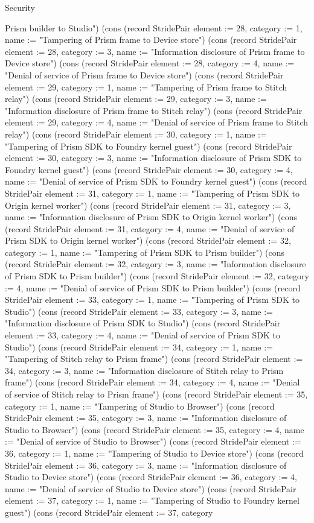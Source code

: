 \begin{lexlean}{Security}
\begin{semanticmodule}
{Prism builder to Studio"}) (cons (record StridePair {element := 28, category := 1, name := "Tampering of Prism frame to Device store"}) (cons (record StridePair {element := 28, category := 3, name := "Information disclosure of Prism frame to Device store"}) (cons (record StridePair {element := 28, category := 4, name := "Denial of service of Prism frame to Device store"}) (cons (record StridePair {element := 29, category := 1, name := "Tampering of Prism frame to Stitch relay"}) (cons (record StridePair {element := 29, category := 3, name := "Information disclosure of Prism frame to Stitch relay"}) (cons (record StridePair {element := 29, category := 4, name := "Denial of service of Prism frame to Stitch relay"}) (cons (record StridePair {element := 30, category := 1, name := "Tampering of Prism SDK to Foundry kernel guest"}) (cons (record StridePair {element := 30, category := 3, name := "Information disclosure of Prism SDK to Foundry kernel guest"}) (cons (record StridePair {element := 30, category := 4, name := "Denial of service of Prism SDK to Foundry kernel guest"}) (cons (record StridePair {element := 31, category := 1, name := "Tampering of Prism SDK to Origin kernel worker"}) (cons (record StridePair {element := 31, category := 3, name := "Information disclosure of Prism SDK to Origin kernel worker"}) (cons (record StridePair {element := 31, category := 4, name := "Denial of service of Prism SDK to Origin kernel worker"}) (cons (record StridePair {element := 32, category := 1, name := "Tampering of Prism SDK to Prism builder"}) (cons (record StridePair {element := 32, category := 3, name := "Information disclosure of Prism SDK to Prism builder"}) (cons (record StridePair {element := 32, category := 4, name := "Denial of service of Prism SDK to Prism builder"}) (cons (record StridePair {element := 33, category := 1, name := "Tampering of Prism SDK to Studio"}) (cons (record StridePair {element := 33, category := 3, name := "Information disclosure of Prism SDK to Studio"}) (cons (record StridePair {element := 33, category := 4, name := "Denial of service of Prism SDK to Studio"}) (cons (record StridePair {element := 34, category := 1, name := "Tampering of Stitch relay to Prism frame"}) (cons (record StridePair {element := 34, category := 3, name := "Information disclosure of Stitch relay to Prism frame"}) (cons (record StridePair {element := 34, category := 4, name := "Denial of service of Stitch relay to Prism frame"}) (cons (record StridePair {element := 35, category := 1, name := "Tampering of Studio to Browser"}) (cons (record StridePair {element := 35, category := 3, name := "Information disclosure of Studio to Browser"}) (cons (record StridePair {element := 35, category := 4, name := "Denial of service of Studio to Browser"}) (cons (record StridePair {element := 36, category := 1, name := "Tampering of Studio to Device store"}) (cons (record StridePair {element := 36, category := 3, name := "Information disclosure of Studio to Device store"}) (cons (record StridePair {element := 36, category := 4, name := "Denial of service of Studio to Device store"}) (cons (record StridePair {element := 37, category := 1, name := "Tampering of Studio to Foundry kernel guest"}) (cons (record StridePair {element := 37, category }
\end{semanticmodule}
\end{lexlean}
